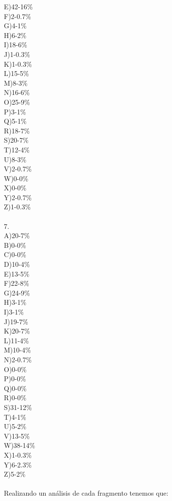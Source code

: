 \documentclass[letterpaper,10pt]{article}
\begin{document}
\begin{enumerate}
\begin{enumerate}
E)42-16\%\\
F)2-0.7\%\\
G)4-1\%\\
H)6-2\%\\
I)18-6\%\\
J)1-0.3\%\\
K)1-0.3\%\\
L)15-5\%\\
M)8-3\%\\
N)16-6\%\\
O)25-9\%\\
P)3-1\%\\
Q)5-1\%\\
R)18-7\%\\
S)20-7\%\\
T)12-4\%\\
U)8-3\%\\
V)2-0.7\%\\
W)0-0\%\\
X)0-0\%\\
Y)2-0.7\%\\
Z)1-0.3\%\\\\
7.\\
A)20-7\%\\
B)0-0\%\\
C)0-0\%\\
D)10-4\%\\
E)13-5\%\\
F)22-8\%\\
G)24-9\%\\
H)3-1\%\\
I)3-1\%\\
J)19-7\%\\
K)20-7\%\\
L)11-4\%\\
M)10-4\%\\
N)2-0.7\%\\
O)0-0\%\\
P)0-0\%\\
Q)0-0\%\\
R)0-0\%\\
S)31-12\%\\
T)4-1\%\\
U)5-2\%\\
V)13-5\%\\
W)38-14\%\\
X)1-0.3\%\\
Y)6-2.3\%\\
Z)5-2\%\\\\
Realizando un análisis de cada fragmento tenemos que:\\\\

\end{enumerate}
\end{enumerate}
\end{document}
